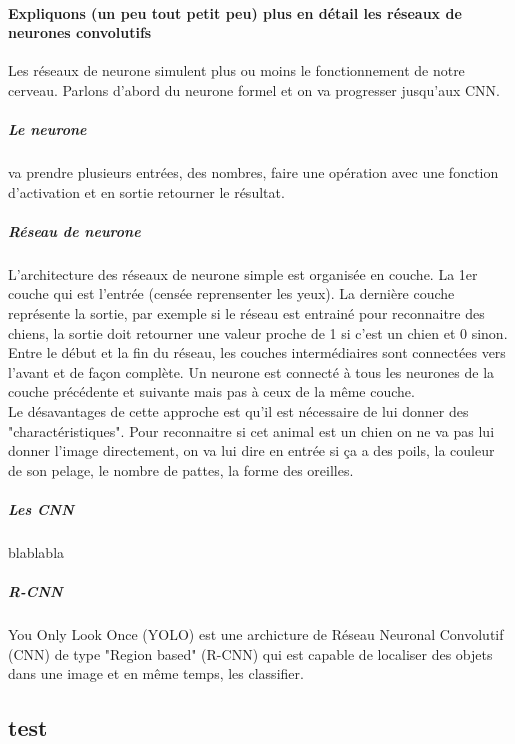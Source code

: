 \documentclass[a4paper]{article}
\begin{document}
				\paragraph{Expliquons (un peu tout petit peu) plus en détail les réseaux de neurones convolutifs}
					Les réseaux de neurone simulent plus ou moins le fonctionnement de notre cerveau. Parlons d'abord du neurone formel et on va progresser jusqu'aux CNN.
					\subparagraph{Le neurone} va prendre plusieurs entrées, des nombres, faire une opération avec une fonction d'activation et en sortie retourner le résultat.
					\subparagraph{Réseau de neurone} L'architecture des réseaux de neurone simple est organisée en couche. La 1er couche qui est l'entrée (censée reprensenter les yeux).
						La dernière couche représente la sortie, par exemple si le réseau est entrainé pour reconnaitre des chiens, la sortie doit retourner une valeur proche de 1 si c'est un chien et 0 sinon.
						Entre le début et la fin du réseau, les couches intermédiaires sont connectées vers l'avant et de façon complète. Un neurone est connecté à tous les neurones de la couche précédente et suivante mais pas à ceux de la même couche.
					\\Le désavantages de cette approche est qu'il est nécessaire de lui donner des "charactéristiques". Pour reconnaitre si cet animal est un chien on ne va pas lui donner l'image directement, on va lui dire en entrée si ça a des poils, la couleur de son pelage, le nombre de pattes, la forme des oreilles.
					\subparagraph{Les CNN} blablabla
					\subparagraph{R-CNN}
				\paragraph{}
					You Only Look Once (YOLO) est une archicture de Réseau Neuronal Convolutif (CNN) de type "Region based" (R-CNN) qui est capable de localiser des objets dans une image et en même temps, les classifier.
		\subsection*{test}
			\blindtext
	\newpage
\end{document}
